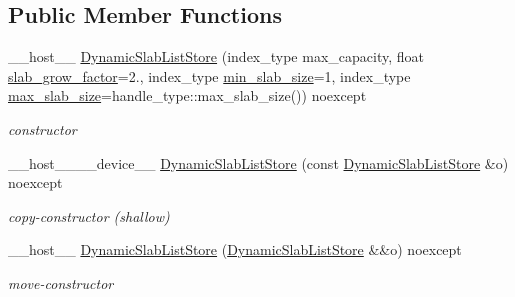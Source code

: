 \subsection*{Public Member Functions}
\begin{DoxyCompactItemize}
\item 
\+\_\+\+\_\+host\+\_\+\+\_\+ \hyperlink{classwarpcore_1_1storage_1_1multi__value_1_1DynamicSlabListStore_ab0c3eb9a8eaef07da0eb5d7d3c5f026a}{Dynamic\+Slab\+List\+Store} (index\+\_\+type max\+\_\+capacity, float \hyperlink{classwarpcore_1_1storage_1_1multi__value_1_1DynamicSlabListStore_a79fb2a41f22cf59f4edf49c3de82d9dd}{slab\+\_\+grow\+\_\+factor}=2., index\+\_\+type \hyperlink{classwarpcore_1_1storage_1_1multi__value_1_1DynamicSlabListStore_adb7da0e5836a0274de92f906acaf7a43}{min\+\_\+slab\+\_\+size}=1, index\+\_\+type \hyperlink{classwarpcore_1_1storage_1_1multi__value_1_1DynamicSlabListStore_a58f11e19acf684db903b7985364ec73c}{max\+\_\+slab\+\_\+size}=handle\+\_\+type\+::max\+\_\+slab\+\_\+size()) noexcept
\begin{DoxyCompactList}\small\item\em constructor \end{DoxyCompactList}\item 
\+\_\+\+\_\+host\+\_\+\+\_\+\+\_\+\+\_\+device\+\_\+\+\_\+ \hyperlink{classwarpcore_1_1storage_1_1multi__value_1_1DynamicSlabListStore_a93d49c0a887055b282000cba031688d5}{Dynamic\+Slab\+List\+Store} (const \hyperlink{classwarpcore_1_1storage_1_1multi__value_1_1DynamicSlabListStore}{Dynamic\+Slab\+List\+Store} \&o) noexcept
\begin{DoxyCompactList}\small\item\em copy-\/constructor (shallow) \end{DoxyCompactList}\item 
\+\_\+\+\_\+host\+\_\+\+\_\+ \hyperlink{classwarpcore_1_1storage_1_1multi__value_1_1DynamicSlabListStore_a7be0cfee3a16cba0eb6296168d518a58}{Dynamic\+Slab\+List\+Store} (\hyperlink{classwarpcore_1_1storage_1_1multi__value_1_1DynamicSlabListStore}{Dynamic\+Slab\+List\+Store} \&\&o) noexcept
\begin{DoxyCompactList}\small\item\em move-\/constructor \end{DoxyCompactList}\item 
\mbox{\label{classwarpcore_1_1storage_1_1multi__value_1_1DynamicSlabListStore_ab53d32d2ef4976130ae986c866802b6d}} 

\end{DoxyCompactItemize}
